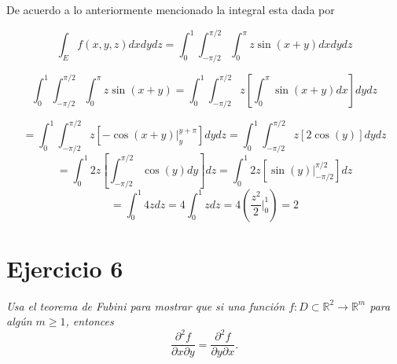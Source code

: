 \documentclass[a4paper,12pt]{article}
\begin{document}
De acuerdo a lo anteriormente mencionado la integral esta dada por

\[\int_{E} f(x,y,z)dxdydz = \int_{0}^{1} \int_{-\pi/2}^{\pi/2} \int_{0}^{\pi} z\sin (x+y) dxdydz\]

\[\int_{0}^{1} \int_{-\pi/2}^{\pi/2} \int_{0}^{\pi} z\sin (x+y) = \int_{0}^{1} \int_{-\pi/2}^{\pi/2} z \left[ \int_{0}^{\pi} \sin (x+y) dx \right] dydz \]

\[ = \int_{0}^{1} \int_{-\pi/2}^{\pi/2} z \left[ -\cos (x+y) \vert_{y}^{y + \pi} \right] dydz = \int_{0}^{1} \int_{-\pi/2}^{\pi/2} z \left[ 2\cos (y)\right] dydz\]
\[ = \int_{0}^{1} 2z\left[\int_{-\pi/2}^{\pi/2}  \cos (y) dy\right] dz =  \int_{0}^{1} 2z\left[\sin(y) \vert_{-\pi/2}^{\pi/2}\right] dz\]
\[ = \int_{0}^{1} 4z dz = 4 \int_{0}^{1} z dz = 4 (\frac{z^2}{2}\vert_{0}^1) = 2 \]

\newpage
\section{Ejercicio 6}
\textit{Usa el teorema de Fubini para mostrar que si una función $f : D \subset \mathbb{R}^2 \rightarrow \mathbb{R}^m$
para algún $m \geq 1$, entonces}
\[\frac{\partial^2 f}{\partial x \partial y} = \frac{\partial^2 f}{\partial y \partial x}.\]
\end{document}
